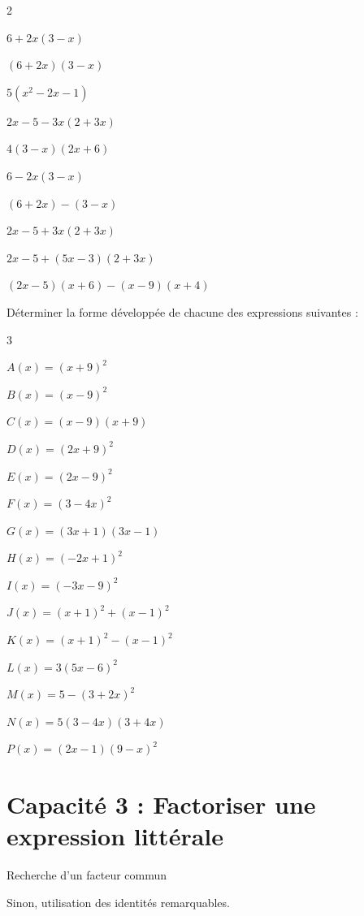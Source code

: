 \documentclass[10pt,a4paper]{article}  %
\begin{document}
\begin{multicols}{2}
	\begin{enumMet}
  \item $6+2 x(3-x)$
  \item $(6+2 x)(3-x)$
  \item $5\left(x^{2}-2 x-1\right)$
  \item $2 x-5-3 x(2+3 x)$
  \item $4(3-x)(2 x+6)$
  \item $6-2 x(3-x)$
  \item $(6+2 x)-(3-x)$
  \item $2 x-5+3 x(2+3 x)$
  \item $2 x-5+(5 x-3)(2+3 x)$
  \item $(2 x-5)(x+6)-(x-9)(x+4)$
\end{enumMet}
\end{multicols}
\vspace*{-0.8cm}
Déterminer la forme développée de chacune des expressions suivantes :

\begin{multicols}{3}
	\begin{enumMet}
		\item $A(x)=(x+9)^{2}$
		\item $B(x)=(x-9)^{2}$
		\item $C(x)=(x-9)(x+9)$
		\item $D(x)=(2 x+9)^{2}$
		\item $E(x)=(2 x-9)^{2}$
		\item $F(x)=(3-4 x)^{2}$
		\item $G(x)=(3 x+1)(3 x-1)$
		\item $H(x)=(-2 x+1)^{2}$
		\item $I(x)=(-3 x-9)^{2}$
		\item $J(x)=(x+1)^{2}+(x-1)^{2}$
		\item $K(x)=(x+1)^{2}-(x-1)^{2}$
		\item $L(x)=3(5 x-6)^{2}$
		\item $M(x)=5-(3+2 x)^{2}$
		\item $N(x)=5(3-4 x)(3+4 x)$
		\item $P(x)=(2 x-1)(9-x)^{2}$
	\end{enumMet}
\end{multicols}
\section*{Capacité 3 : Factoriser une expression littérale}
\begin{brappel}
	\begin{itemMet}
		\item Recherche d'un facteur commun
		\item Sinon, utilisation des identités remarquables.
	\end{itemMet}
\end{brappel}
\end{document}

